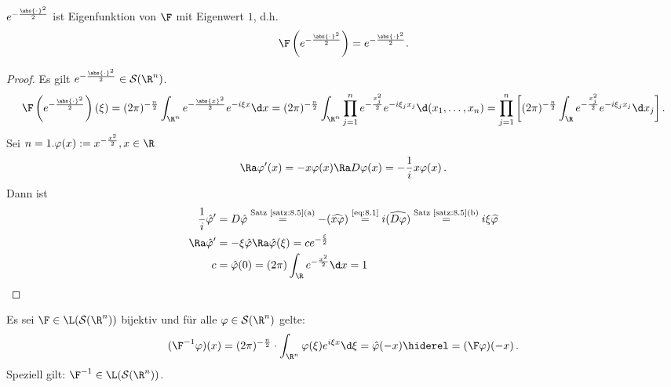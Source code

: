 \begin{lemma}
\label{lemma:8.6}
$e^{-\frac{\abs{\cdot }^2}2}$ ist Eigenfunktion von $\F$ mit Eigenwert $1$, d.h.
\[
	\F\left(e^{-\frac{\abs{\cdot }^2}2}\right) = e^{-\frac{\abs{\cdot }^2}2}.
\]
\end{lemma}

\begin{proof}
Es gilt $e^{-\frac{\abs{\cdot }^2}2} \in \mathcal S(\R^n)$.
\begin{dmath*}
	\F\left(e^{-\frac{\abs{\cdot }^2}2}\right) (\xi) = (2\pi)^{-\frac n2} \int_{\R^n} e^{-\frac{\abs{x }^2}2} e^{-i\xi x} \d x 
	= (2\pi)^{-\frac n2} \int_{\R^n} \prod_{j=1}^n e^{-\frac{x_j^2}2} e^{-i\xi_j x_j} \d (x_1,\ldots, x_n)
	= \prod_{j=1}^n \left[ (2\pi)^{-\frac n2} \int_\R e^{-\frac{x_j^2}2} e^{-i\xi_j x_j} \d x_j \right].
\end{dmath*}
Sei $n=1. \varphi (x) := x^{-\frac{x^2}2}, x \in \R$
\begin{align}\label{eq:8.1}
	\Ra \varphi'(x) = -x \varphi(x) \Ra D\varphi (x) = - \frac 1 i x \varphi (x) \, .
\end{align}
Dann ist
\begin{align*}
	\frac 1 i \hat\varphi' &= D\hat\varphi \stackrel{\scriptsize\text{Satz}~\ref{satz:8.5}\text{(a)}}= - (\widehat{x\varphi})  \stackrel{\scriptsize\eqref{eq:8.1}}= i (\widehat{D\varphi})  \stackrel{\scriptsize\text{Satz}~\ref{satz:8.5}\text{(b)}}= i \xi \widehat\varphi \\
	\Ra \hat\varphi' &= -\xi\hat\varphi \Ra \hat\varphi (\xi) = c e^{-\frac\xi 2} \\
	c &= \hat\varphi(0) = (2\pi) \int_{\R} e^{-\frac{x^2}2} \d x = 1 \qedhere
\end{align*}
\end{proof}

\begin{theorem}
  \label{theorem:8.7}
  Es sei $\F\in\L(\mathcal S(\R^n))$ bijektiv und für alle $\varphi\in \mathcal S(\R^n)$ gelte:
  \begin{dmath*}
    (\F^{-1}\varphi)(x)
    =(2\pi)^{-\frac n2}\cdot\int_{\R^n}\varphi(\xi)e^{i\xi x}\d\xi
    =\hat\varphi(-x)\hiderel=(\F\varphi)(-x)\, .
  \end{dmath*}
  Speziell gilt: $\F^{-1}\in\L(\mathcal S(\R^n))$.
\end{theorem}

